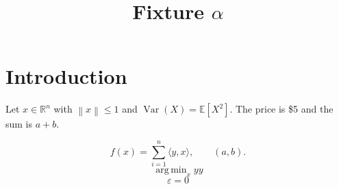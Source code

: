 \documentclass{article}
\newcommand{\R}{\mathbb{R}}
\newcommand{\norm}[1]{\left\lVert #1\right\rVert}
\newcommand{\inner}[2][x]{\langle #1, #2\rangle}
\renewcommand{\epsilon}{\varepsilon}
\def\E{\mathbb{E}}
\def\pair#1#2{(#1,#2)}
\DeclareMathOperator{\Var}{Var}
\DeclareMathOperator*{\argmin}{arg\,min}
\newenvironment{eq}{\begin{equation}}{\end{equation}}
\newcommand{\be}{\begin{equation}}
\newcommand{\ee}{\end{equation}}
\newcommand{\twice}[1]{#1#1}
\begin{document}
\title{Fixture $\alpha$}
\maketitle
\section{Introduction}
Let $x \in \R^n$ with $\norm{x} \le 1$ and $\Var(X)=\E[X^2]$.
The price is \$5 and the sum is $a+b$.

\begin{equation}\label{eq:one}
  f(x) = \sum_{i=1}^{n} \inner[y]{x}, \qquad \pair{a}{b}.
\end{equation}
\be
\argmin_x \twice{y}
\ee
\begin{eq}
\epsilon = 0
\end{eq}
\end{document}
